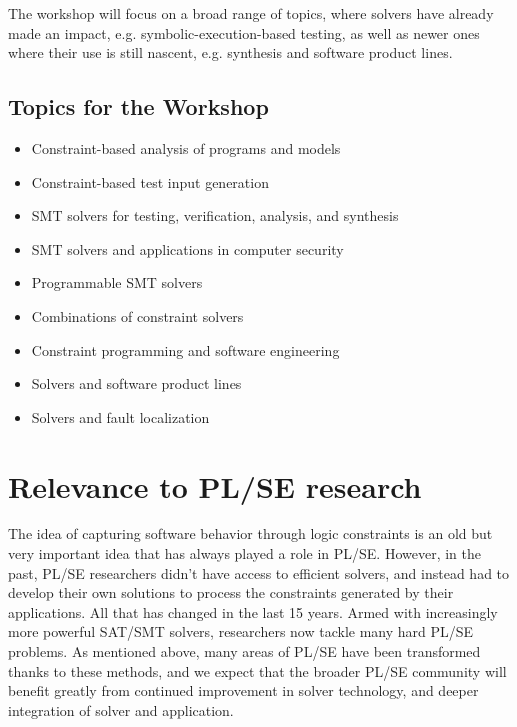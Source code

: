 \documentclass{sig-alternate}
\begin{document}
The workshop will focus on a broad range of topics, where
solvers have already made an impact, e.g. symbolic-execution-based testing, as
well as newer ones where their use is still nascent, e.g. synthesis and
software product lines.

\subsection*{Topics for the Workshop}
\vspace{0.2cm}

\begin{itemize}
\item Constraint-based analysis of programs and models
\item Constraint-based test input generation
\item SMT solvers for testing, verification, analysis, and synthesis
\item SMT solvers and applications in computer security
\item Programmable SMT solvers
\item Combinations of constraint solvers
\item Constraint programming and software engineering
\item Solvers and software product lines
\item Solvers and fault localization
\end{itemize}

\section{Relevance to PL/SE research}
The idea of capturing software behavior through logic
constraints is an old but very important idea that has always played a role in
PL/SE.  However, in the past, PL/SE researchers didn't have access to efficient
solvers, and instead had to develop their own solutions to process the
constraints generated by their applications. All that has changed in the last
15 years. Armed with increasingly more powerful SAT/SMT solvers, researchers
now tackle many hard PL/SE problems. As mentioned above, many areas of PL/SE
have been transformed thanks to these methods, and we expect that the broader
PL/SE community will benefit greatly from continued improvement in solver
technology, and deeper integration of solver and application.
\end{document}
